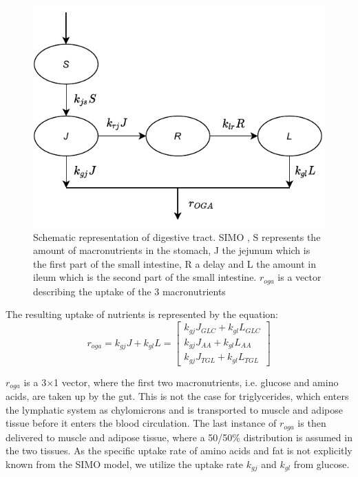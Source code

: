 \documentclass{IEEEtran}
\begin{document}
\begin{figure}[H]
    \centering
    \includegraphics[width=0.75\columnwidth]{Diagrams/SIMO.pdf}
    \caption{Schematic representation of digestive tract. SIMO \cite{panunzi_pompa_borri_piemonte_gaetano_2020}, S represents the amount of macronutrients in the stomach, J the jejunum which is the first part of the small intestine, R a delay and L the amount in ileum which is the second part of the small intestine. $r_{oga}$ is a vector describing the uptake of the 3 macronutrients}
    \label{fig:simo}
\end{figure}



The resulting uptake of nutrients is represented by the equation:
\begin{equation}
    r_{oga} = k_{gj}J + k_{gl}L = \begin{bmatrix}
           k_{gj}J_{GLC} + k_{gl}L_{GLC} \\
           k_{gj}J_{AA} + k_{gl}L_{AA} \\
           k_{gj}J_{TGL} + k_{gl}L_{TGL}
         \end{bmatrix}
\end{equation}

$r_{oga}$ is a 3$\times$1 vector, where the first two macronutrients, i.e. glucose and amino acids, are taken up by the gut. This is not the case for triglycerides, which enters the lymphatic system as chylomicrons and is transported to muscle and adipose tissue before it enters the blood circulation\cite{gropper_smith_carr_2018}. The last instance of $r_{oga}$ is then delivered to muscle and adipose tissue, where a 50/50\% distribution is assumed in the two tissues. As the specific uptake rate of amino acids and fat is not explicitly known from the SIMO model, we utilize the uptake rate $k_{gj}$ and $k_{gl}$ from glucose.\\
\end{document}
